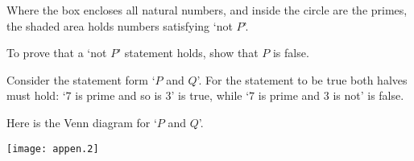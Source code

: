 \begin{center}
%
%
%
\end{center}
Where the box encloses all natural numbers, and inside the circle are
the primes, the shaded area holds numbers satisfying `not \( P \)'.

To prove that a `not \( P \)' statement holds, show that \( P \) is false.

Consider the statement form `\( P \) and \( Q \)'.
For the statement to be true both halves must hold:
`\( 7 \) is prime and so is \( 3 \)' is true, while
`\( 7 \) is prime and \( 3 \) is not' is false.

Here is the Venn diagram for `\( P \) and \( Q \)'.
\begin{center}
  \texttt{[image: appen.2]}
%
%
%
\end{center}

